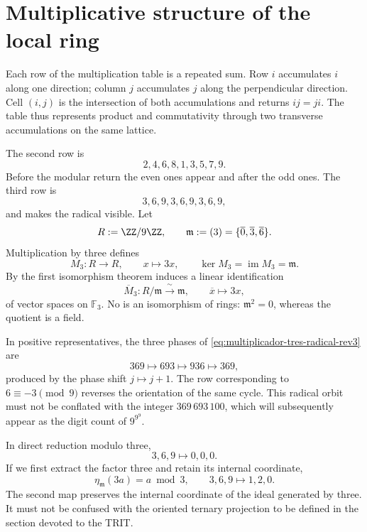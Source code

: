 \section{Multiplicative structure of the local ring}

Each row of the multiplication table is a repeated sum. Row \(i\)
accumulates \(i\) along one direction; column \(j\) accumulates \(j\) along
the perpendicular direction. Cell \((i,j)\) is the intersection
of both accumulations and returns \(ij=ji\). The table thus represents product
and commutativity through two transverse accumulations on the same
lattice.

The second row is
\[
2,4,6,8,1,3,5,7,9.
\]
Before the modular return the even ones appear and after the odd ones. The third
row is
\[
3,6,9,3,6,9,3,6,9,
\]
and makes the radical visible. Let
\[
 R:=\ZZ/9\ZZ,
 \qquad
 \mathfrak m:=(3)=\{\overline0,\overline3,\overline6\}.
\]
Multiplication by three defines
\[
 M_3:R\longrightarrow R,
 \qquad x\longmapsto3x,
 \qquad
 \ker M_3=\operatorname{im}M_3=\mathfrak m.
\]
By the first isomorphism theorem induces a linear identification
\begin{equation}
 \overline M_3:R/\mathfrak m\xrightarrow{\ \sim\ }\mathfrak m,
 \qquad \overline x\longmapsto3x,
 \label{eq:multiplicador-tres-radical-rev3}
\end{equation}
of vector spaces on \(\mathbb F_3\). No is an isomorphism of
rings: \(\mathfrak m^2=0\), whereas the quotient is a field.

In positive representatives, the three phases of
\eqref{eq:multiplicador-tres-radical-rev3} are
\begin{equation}
 369\longmapsto693\longmapsto936\longmapsto369,
 \label{eq:orbita-radical-369-rev3}
\end{equation}
produced by the phase shift \(j\mapsto j+1\). The row
corresponding to \(6\equiv-3\pmod9\) reverses the orientation of the same
cycle. This radical orbit must not be conflated with the integer
\(369\,693\,100\), which will subsequently appear as the digit count of
\(9^{9^9}\).

In direct reduction modulo three,
\[
3,6,9\longmapsto0,0,0.
\]
If we first extract the factor three and retain its internal coordinate,
\[
\eta_{\mathfrak m}(3a)=a\bmod3,
\qquad
3,6,9\longmapsto1,2,0.
\]
The second map preserves the internal coordinate of the ideal generated by
three. It must not be confused with the oriented ternary projection to be defined
in the section devoted to the TRIT\@.

